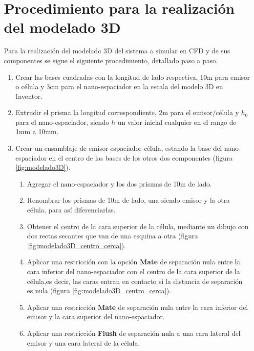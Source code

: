 \chapter[Procedimiento del modelado 3D]{Procedimiento para la realización del modelado 3D}\label{ch:procedimientosModelado3D}
Para la realización del modelado 3D del sistema a simular en CFD y de sus componentes se sigue el siguiente procedimiento, detallado paso a paso.
\begin{enumerate}
	\item Crear las bases cuadradas con la longitud de lado respectiva, 10m para emisor o célula y 3cm para el nano-espaciador en la escala del modelo 3D en Inventor. 
	\item Extrudir el prisma la longitud correspondiente, 2m para el emisor/célula y $h_0$ para el nano-espaciador, siendo $h$ un valor inicial cualquier en el rango de 1mm a 10mm.
	\item Crear un ensamblaje de emisor-espaciador-célula, estando la base del nano-espaciador en el centro de las bases de los otros dos componentes (figura \ref{fig:modelado3D}).
	\begin{enumerate}
		\item Agregar el nano-espaciador y los dos prismas de 10m de lado.
		\item Renombrar los prismas de 10m de lado, una siendo emisor y la otra célula, para así diferenciarlas.
		\item Obtener el centro de la cara superior de la célula, mediante un dibujo con dos rectas secantes que van de una esquina a otra (figura \ref{fig:modelado3D_centro_cerca}).
		\item Aplicar una restricción con la opción \textbf{Mate} de separación nula entre la cara inferior del nano-espaciador con el centro de la cara superior de la célula,es decir, las caras entran en contacto si la distancia de separación es nula (figura \ref{fig:modelado3D_centro_cerca}).
		\item Aplicar una restricción \textbf{Mate} de separación nula entre la cara inferior del emisor y la cara superior del nano-espaciador.
		\item Aplicar una restricción \textbf{Flush} de separación nula a una cara lateral del emisor y una cara lateral de la célula.

\end{enumerate}
\end{enumerate}
